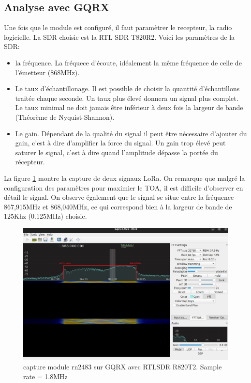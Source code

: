 \subsection{Analyse avec GQRX}

Une fois que le module est configuré, il faut paramètrer le recepteur, la radio logicielle. La SDR choisie est la RTL SDR T820R2. Voici les paramètres de la SDR:

\vspace{0.1cm}

\begin{itemize}
\item la fréquence. La fréquece d'écoute, idéalement la même fréquence de celle de l'émetteur (868MHz).
\item Le taux d'échantillonage. Il est possible de choisir la quantité d'échantillons traitée chaque seconde. Un taux plus élevé donnera un signal plus complet. Le taux minimal ne doit jamais être inférieur à deux fois la largeur de bande (Théorème de Nyquist-Shannon).
\item Le gain. Dépendant de la qualité du signal il peut être nécessaire d'ajouter du gain, c'est à dire d'amplifier la force du signal. Un gain trop élevé peut saturer le signal, c'est à dire quand l'amplitude dépasse la portée du récepteur.
\end{itemize}

\vspace{0.1cm}

La figure \ref{term301} montre la capture de deux signaux LoRa. On remarque que malgré la configuration des paramètres pour maximier le TOA, il est difficile d'observer en détail le signal. On observe également que le signal se situe entre la fréquence 867,915MHz et 868,040MHz, ce qui correspond bien à la largeur de bande de 125Khz (0.125MHz) choisie.

\begin{figure}[h]
\centering

\includegraphics[scale=0.28]{images/gqrx4.png}
\caption{capture module rn2483 sur GQRX avec RTLSDR R820T2. Sample rate = 1.8MHz}\label{term301}
\end{figure}

